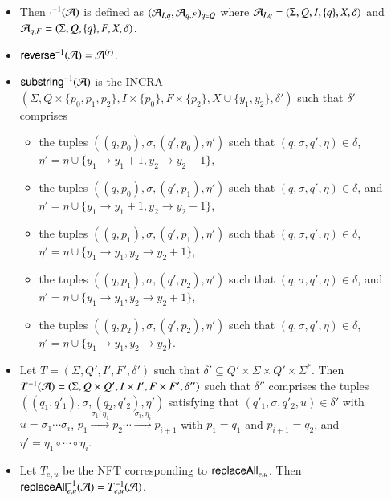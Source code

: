 \documentclass[sigplan,review,anonymous]{acmart}\settopmatter{printfolios=true,printccs=false,printacmref=false}
\begin{document}
\begin{itemize}
	\item Then $\cdot^{-1}(\mathcal{A})$ is defined as $(\mathcal{A}_{I, q}, \mathcal{A}_{q, F})_{q \in Q}$ where $\mathcal{A}_{I, q}=(\Sigma, Q, I, \{q\}, X, \delta)$ and  $\mathcal{A}_{q, F}=(\Sigma, Q, \{q\}, F, X, \delta)$.
	
	\item $\mathsf{reverse}^{-1}(\mathcal{A}) = \mathcal{A}^{(r)}$.
	
	\item $\mathsf{substring}^{-1}(\mathcal{A})$ is the INCRA $(\Sigma, Q \times \{p_0, p_1, p_2\}, I \times \{p_0\}, F \times \{p_2\}, X \cup \{y_1, y_2\}, \delta')$ such that $\delta'$ comprises 
	\begin{itemize}
		\item the tuples $((q, p_0), \sigma, (q', p_0), \eta')$ such that $(q, \sigma, q', \eta) \in \delta$, $\eta' = \eta \cup \{y_1 \rightarrow y_1+1, y_2 \rightarrow y_2+1\}$,
		\item the tuples $((q, p_0), \sigma, (q', p_1), \eta')$ such that $(q, \sigma, q', \eta) \in \delta$, and $\eta' = \eta \cup \{y_1 \rightarrow y_1+1, y_2 \rightarrow y_2+1\}$,
		\item the tuples $((q, p_1), \sigma, (q', p_1), \eta')$ such that $(q, \sigma, q', \eta) \in \delta$, $\eta' = \eta \cup \{y_1 \rightarrow y_1, y_2 \rightarrow y_2+1\}$,
		\item the tuples $((q, p_1), \sigma, (q', p_2), \eta')$ such that $(q, \sigma, q', \eta) \in \delta$, and $\eta' = \eta \cup \{y_1 \rightarrow y_1, y_2 \rightarrow y_2+1\}$,
		\item the tuples $((q, p_2), \sigma, (q', p_2), \eta')$ such that $(q, \sigma, q', \eta) \in \delta$, $\eta' = \eta \cup \{y_1 \rightarrow y_1, y_2 \rightarrow y_2\}$.
	\end{itemize}
	\item Let $T= (\Sigma, Q', I', F', \delta')$ such that $\delta' \subseteq Q' \times \Sigma \times Q' \times \Sigma^*$. Then $T^{-1}(\mathcal{A}) = (\Sigma, Q \times Q', I \times I', F \times F', \delta'')$ such that $\delta''$ comprises the tuples $((q_1, q'_1), \sigma, (q_2, q'_2), \eta')$ satisfying that $(q'_1, \sigma, q'_2, u) \in \delta'$ with $u = \sigma_1 \cdots \sigma_i$, $p_1 \xrightarrow{\sigma_1, \eta_1} p_2 \cdots \xrightarrow{\sigma_i, \eta_i} p_{i+1}$ with $p_1 = q_1$ and $p_{i+1}= q_2$, and $\eta' = \eta_1 \circ \cdots \circ \eta_i$.
	\item  Let $T_{e,u}$ be the NFT corresponding to $\mathsf{replaceAll}_{e,u}$. Then $\mathsf{replaceAll}^{-1}_{e,u}(\mathcal{A})=T^{-1}_{e,u}(\mathcal{A})$.
\end{itemize}
\end{document}

